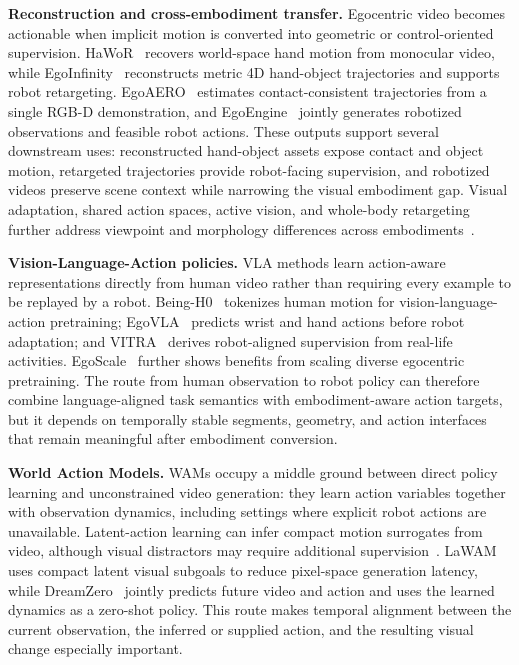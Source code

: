 \textbf{Reconstruction and cross-embodiment transfer.}
Egocentric video becomes actionable when implicit motion is converted into geometric or control-oriented supervision. HaWoR~\cite{hawor2025} recovers world-space hand motion from monocular video, while EgoInfinity~\cite{egoinfinity2026} reconstructs metric 4D hand-object trajectories and supports robot retargeting. EgoAERO~\cite{niu2026egoaero} estimates contact-consistent trajectories from a single RGB-D demonstration, and EgoEngine~\cite{liu2026egoengine} jointly generates robotized observations and feasible robot actions. These outputs support several downstream uses: reconstructed hand-object assets expose contact and object motion, retargeted trajectories provide robot-facing supervision, and robotized videos preserve scene context while narrowing the visual embodiment gap. Visual adaptation, shared action spaces, active vision, and whole-body retargeting further address viewpoint and morphology differences across embodiments~\cite{phantom2025,luo2026beingh05,yu2025egomi,yang2026zerowbc,shi2026egohumanoid}.

\textbf{Vision-Language-Action policies.}
VLA methods learn action-aware representations directly from human video rather than requiring every example to be replayed by a robot. Being-H0~\cite{luo2025being} tokenizes human motion for vision-language-action pretraining; EgoVLA~\cite{egovla2025} predicts wrist and hand actions before robot adaptation; and VITRA~\cite{vitra2025} derives robot-aligned supervision from real-life activities. EgoScale~\cite{egoscale2026} further shows benefits from scaling diverse egocentric pretraining. The route from human observation to robot policy can therefore combine language-aligned task semantics with embodiment-aware action targets, but it depends on temporally stable segments, geometry, and action interfaces that remain meaningful after embodiment conversion.

\textbf{World Action Models.}
WAMs occupy a middle ground between direct policy learning and unconstrained video generation: they learn action variables together with observation dynamics, including settings where explicit robot actions are unavailable. Latent-action learning can infer compact motion surrogates from video, although visual distractors may require additional supervision~\cite{laom2025}. LaWAM~\cite{chen2026lawam} uses compact latent visual subgoals to reduce pixel-space generation latency, while DreamZero~\cite{dreamzero2026} jointly predicts future video and action and uses the learned dynamics as a zero-shot policy. This route makes temporal alignment between the current observation, the inferred or supplied action, and the resulting visual change especially important.

